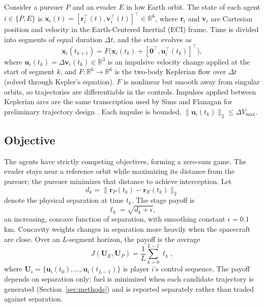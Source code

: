 
Consider a pursuer $P$ and an evader $E$ in low Earth orbit. The state of each agent $i \in \{P, E\}$ is $\mathbf{x}_i(t) = [\mathbf{r}_i^\top(t), \mathbf{v}_i^\top(t)]^\top \in \mathbb{R}^6$, where $\mathbf{r}_i$ and $\mathbf{v}_i$ are Cartesian position and velocity in the Earth-Centered Inertial (ECI) frame. Time is divided into segments of equal duration $\Delta t$, and the state evolves as
%
\begin{equation}
\mathbf{x}_i(t_{k+1}) = F\big(\mathbf{x}_i(t_k) + [\mathbf{0}^\top, \mathbf{u}_i^\top(t_k)]^\top\big),
\label{eq:state_eom}
\end{equation}
%
where $\mathbf{u}_i(t_k) = \Delta \mathbf{v}_i(t_k) \in \mathbb{R}^3$ is an impulsive velocity change applied at the start of segment $k$, and $F: \mathbb{R}^6 \to \mathbb{R}^6$ is the two-body Keplerian flow over $\Delta t$ (solved through Kepler's equation). $F$ is nonlinear but smooth away from singular orbits, so trajectories are differentiable in the controls. Impulses applied between Keplerian arcs are the same transcription used by Sims and Flanagan for preliminary trajectory design \cite{sims1997preliminary}. Each impulse is bounded, $\|\mathbf{u}_i(t_k)\|_2 \leq \Delta V_{\max}$.


\subsection{Objective}

The agents have strictly competing objectives, forming a zero-sum game. The evader stays near a reference orbit while maximizing its distance from the pursuer; the pursuer minimizes that distance to achieve interception. Let
%
\begin{equation}
d_k = \|\mathbf{r}_P(t_k) - \mathbf{r}_E(t_k)\|_2
\label{eq:distance}
\end{equation}
%
denote the physical separation at time $t_k$. The stage payoff is
%
\begin{equation}
\ell_k = \sqrt{d_k + \epsilon},
\label{eq:stage_payoff}
\end{equation}
%
an increasing, concave function of separation, with smoothing constant $\epsilon = 0.1$ km. Concavity weights changes in separation more heavily when the spacecraft are close. Over an $L$-segment horizon, the payoff is the average
%
\begin{equation}
J(\mathbf{U}_E, \mathbf{U}_P) = \frac{1}{L}\sum_{k=0}^{L-1} \ell_k ,
\label{eq:objective}
\end{equation}
%
where $\mathbf{U}_i = \{\mathbf{u}_i(t_0), \dots, \mathbf{u}_i(t_{L-1})\}$ is player $i$'s control sequence. The payoff depends on separation only: fuel is minimized when each candidate trajectory is generated (Section~\ref{sec:methods}) and is reported separately rather than traded against separation.

